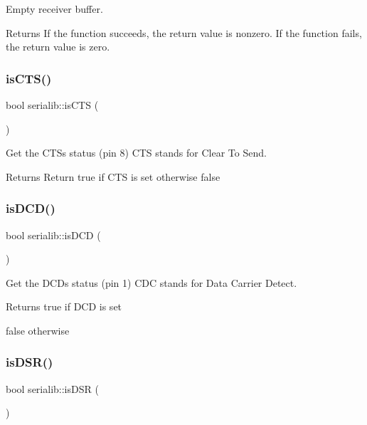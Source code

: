 Empty receiver buffer. 

\begin{DoxyReturn}{Returns}
If the function succeeds, the return value is nonzero. If the function fails, the return value is zero. 
\end{DoxyReturn}
\mbox{\label{classserialib_aca544a6f8dfa33f8e771713646768215}} 
\subsubsection{\texorpdfstring{is\+C\+T\+S()}{isCTS()}}
{\footnotesize\ttfamily bool serialib\+::is\+C\+TS (\begin{DoxyParamCaption}{ }\end{DoxyParamCaption})}



Get the C\+TS\textquotesingle{}s status (pin 8) C\+TS stands for Clear To Send. 

\begin{DoxyReturn}{Returns}
Return true if C\+TS is set otherwise false 
\end{DoxyReturn}
\mbox{\label{classserialib_a5f451a5eea7c8c1bdcff684ba131d6ff}} 
\subsubsection{\texorpdfstring{is\+D\+C\+D()}{isDCD()}}
{\footnotesize\ttfamily bool serialib\+::is\+D\+CD (\begin{DoxyParamCaption}{ }\end{DoxyParamCaption})}



Get the D\+CD\textquotesingle{}s status (pin 1) C\+DC stands for Data Carrier Detect. 

\begin{DoxyReturn}{Returns}
true if D\+CD is set 

false otherwise 
\end{DoxyReturn}
\mbox{\label{classserialib_a3f1f0894543dfb17955de50157965dd7}} 
\subsubsection{\texorpdfstring{is\+D\+S\+R()}{isDSR()}}
{\footnotesize\ttfamily bool serialib\+::is\+D\+SR (\begin{DoxyParamCaption}{ }\end{DoxyParamCaption})}



